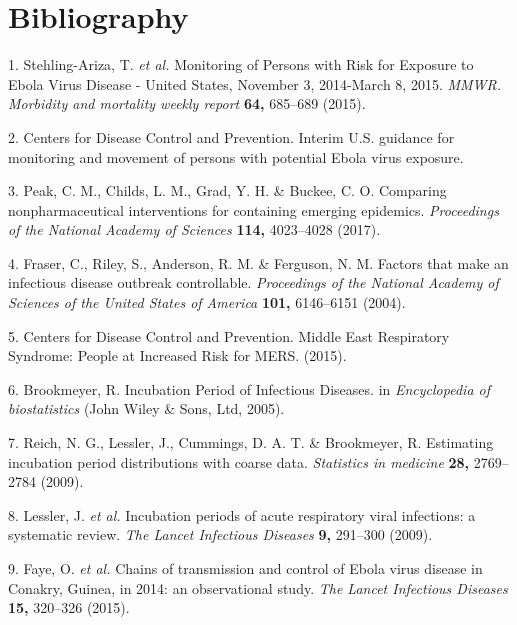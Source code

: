 \documentclass[]{article}
\begin{document}
\section*{Bibliography}\label{bibliography}

\hypertarget{refs}{}
\hypertarget{ref-StehlingAriza:2015vd}{}
1. Stehling-Ariza, T. \emph{et al.} Monitoring of Persons with Risk for
Exposure to Ebola Virus Disease - United States, November 3, 2014-March
8, 2015. \emph{MMWR. Morbidity and mortality weekly report} \textbf{64,}
685--689 (2015).

\hypertarget{ref-CentersforDiseaseControlandPrevention:lyxYF_Hp}{}
2. Centers for Disease Control and Prevention. Interim U.S. guidance for
monitoring and movement of persons with potential Ebola virus exposure.

\hypertarget{ref-peak2017comparing}{}
3. Peak, C. M., Childs, L. M., Grad, Y. H. \& Buckee, C. O. Comparing
nonpharmaceutical interventions for containing emerging epidemics.
\emph{Proceedings of the National Academy of Sciences} \textbf{114,}
4023--4028 (2017).

\hypertarget{ref-Fraser:2004ci}{}
4. Fraser, C., Riley, S., Anderson, R. M. \& Ferguson, N. M. Factors
that make an infectious disease outbreak controllable. \emph{Proceedings
of the National Academy of Sciences of the United States of America}
\textbf{101,} 6146--6151 (2004).

\hypertarget{ref-CentersforDiseaseControlandPrevention:2015tk}{}
5. Centers for Disease Control and Prevention. Middle East Respiratory
Syndrome: People at Increased Risk for MERS. (2015).

\hypertarget{ref-Brookmeyer:2005bc}{}
6. Brookmeyer, R. Incubation Period of Infectious Diseases. in
\emph{Encyclopedia of biostatistics} (John Wiley \& Sons, Ltd, 2005).

\hypertarget{ref-Reich:2009jq}{}
7. Reich, N. G., Lessler, J., Cummings, D. A. T. \& Brookmeyer, R.
Estimating incubation period distributions with coarse data.
\emph{Statistics in medicine} \textbf{28,} 2769--2784 (2009).

\hypertarget{ref-Lessler:2009ub}{}
8. Lessler, J. \emph{et al.} Incubation periods of acute respiratory
viral infections: a systematic review. \emph{The Lancet Infectious
Diseases} \textbf{9,} 291--300 (2009).

\hypertarget{ref-Faye:2015jc}{}
9. Faye, O. \emph{et al.} Chains of transmission and control of Ebola
virus disease in Conakry, Guinea, in 2014: an observational study.
\emph{The Lancet Infectious Diseases} \textbf{15,} 320--326 (2015).
\end{document}
